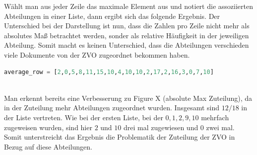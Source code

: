 \documentclass[german,version-2020-11]{uzl-thesis}
\begin{document}
\begin{enumerate}
\begin{center}
\begin{tabular}{ccccccccccccccccccc}
\end{tabular}
\end{center}

Wählt man aus jeder Zeile das maximale Element aus und notiert die assoziierten Abteilungen in einer Liste, dann ergibt sich das folgende Ergebnis. Der Unterschied bei der Darstellung ist nun, dass die Zahlen pro Zeile nicht mehr als absolutes Maß betrachtet werden, sonder als relative Häufigkeit in der jeweiligen Abteilung. Somit macht es keinen Unterschied, dass die Abteilungen verschieden viele Dokumente von der ZVO zugeordnet bekommen haben. \\

\begin{lstlisting}[language=Python]
average_row = [2,0,5,8,11,15,10,4,10,10,2,17,2,16,3,0,7,10]
\end{lstlisting}\\

Man erkennt bereits eine Verbesserung zu Figure X (absolute Max Zuteilung), da in der Zuteilung mehr Abteilungen zugeordnet wurden. Insgesamt sind $12/18$ in der Liste vertreten. Wie bei der ersten Liste, bei der  $ 0,1,2,9,10 $ mehrfach zugeweisen wurden, sind hier $2$ und $10$ drei mal zugewiesen und $0$ zwei mal. Somit unterstreicht das Ergebnis die Problematik der Zuteilung der ZVO in Bezug auf diese Abteilungen. \\

\end{enumerate}


\end{document}
